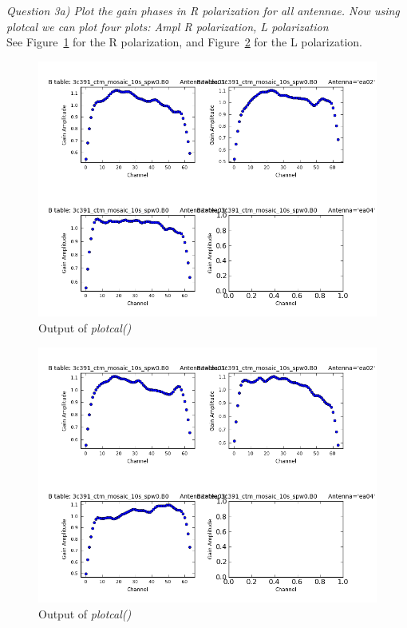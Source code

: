 \documentclass[12pt, a4paper]{article}
\begin{document}
\noindent \textit{Question 3a) Plot the gain phases in R polarization for all antennae. Now using plotcal we can plot four plots: Ampl R polarization, L polarization} \\
See Figure~\ref{fig:part4subE-q3a-R} for the R polarization, and Figure~\ref{fig:part4subE-q3a-L} for the L polarization. \\

\newpage
\begin{figure}[h!]
    \centering
    \includegraphics[scale=0.5]{../Imaging/plots/part4-subE-question3a_amp_pol-R.png}
    \caption{Output of \emph{plotcal()}  \label{fig:part4subE-q3a-R}}
\end{figure}
\begin{figure}[h!]
    \centering
    \includegraphics[scale=0.5]{../Imaging/plots/part4-subE-question3a_amp_pol-L.png}
    \caption{Output of \emph{plotcal()}  \label{fig:part4subE-q3a-L}}
\end{figure}
\newpage
\end{document}
